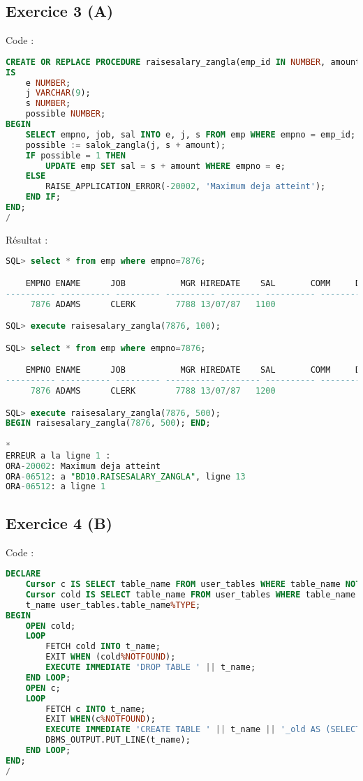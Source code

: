 \documentclass{article}
\begin{document}
\subsection{Exercice 3 (A)}
Code :
\begin{lstlisting}[language=SQL,
    deletekeywords={char},
    morekeywords={DECLARE, LOOP, TYPE, FOR, IF, IS, OPEN, FETCH, DBMS_OUTPUT, PUT_LINE}]
CREATE OR REPLACE PROCEDURE raisesalary_zangla(emp_id IN NUMBER, amount IN NUMBER)
IS
    e NUMBER;
    j VARCHAR(9);
    s NUMBER;
    possible NUMBER;
BEGIN
    SELECT empno, job, sal INTO e, j, s FROM emp WHERE empno = emp_id;
    possible := salok_zangla(j, s + amount);
    IF possible = 1 THEN 
        UPDATE emp SET sal = s + amount WHERE empno = e;
    ELSE
        RAISE_APPLICATION_ERROR(-20002, 'Maximum deja atteint');
    END IF;
END;
/
\end{lstlisting}

Résultat :
\begin{lstlisting}[language=SQL,
    morekeywords={DECLARE, LOOP, TYPE, FOR, IF, IS, OPEN, FETCH, DBMS_OUTPUT, PUT_LINE}]
SQL> select * from emp where empno=7876;

    EMPNO ENAME      JOB	       MGR HIREDATE	   SAL	     COMM     DEPTNO
---------- ---------- --------- ---------- -------- ---------- ---------- ----------
     7876 ADAMS      CLERK	      7788 13/07/87	  1100			           20

SQL> execute raisesalary_zangla(7876, 100);

SQL> select * from emp where empno=7876;

    EMPNO ENAME      JOB	       MGR HIREDATE	   SAL	     COMM     DEPTNO
---------- ---------- --------- ---------- -------- ---------- ---------- ----------
     7876 ADAMS      CLERK	      7788 13/07/87	  1200			            20

SQL> execute raisesalary_zangla(7876, 500);
BEGIN raisesalary_zangla(7876, 500); END;

*
ERREUR a la ligne 1 :
ORA-20002: Maximum deja atteint
ORA-06512: a "BD10.RAISESALARY_ZANGLA", ligne 13
ORA-06512: a ligne 1
\end{lstlisting}

\subsection{Exercice 4 (B)}
Code :
\begin{lstlisting}[language=SQL,
    deletekeywords={char},
    morekeywords={DECLARE, LOOP, TYPE, FOR, IF, IS, OPEN, FETCH, DBMS_OUTPUT, PUT_LINE}]
DECLARE
	Cursor c IS SELECT table_name FROM user_tables WHERE table_name NOT LIKE '%_OLD';
	Cursor cold IS SELECT table_name FROM user_tables WHERE table_name LIKE '%_OLD';
	t_name user_tables.table_name%TYPE;
BEGIN
	OPEN cold;
	LOOP
		FETCH cold INTO t_name;
		EXIT WHEN (cold%NOTFOUND);
		EXECUTE IMMEDIATE 'DROP TABLE ' || t_name;
	END LOOP;
	OPEN c;
	LOOP
		FETCH c INTO t_name;
		EXIT WHEN(c%NOTFOUND); 
		EXECUTE IMMEDIATE 'CREATE TABLE ' || t_name || '_old AS (SELECT * FROM ' || t_name || ')';
		DBMS_OUTPUT.PUT_LINE(t_name);
	END LOOP;
END;
/
\end{lstlisting}
\end{document}
